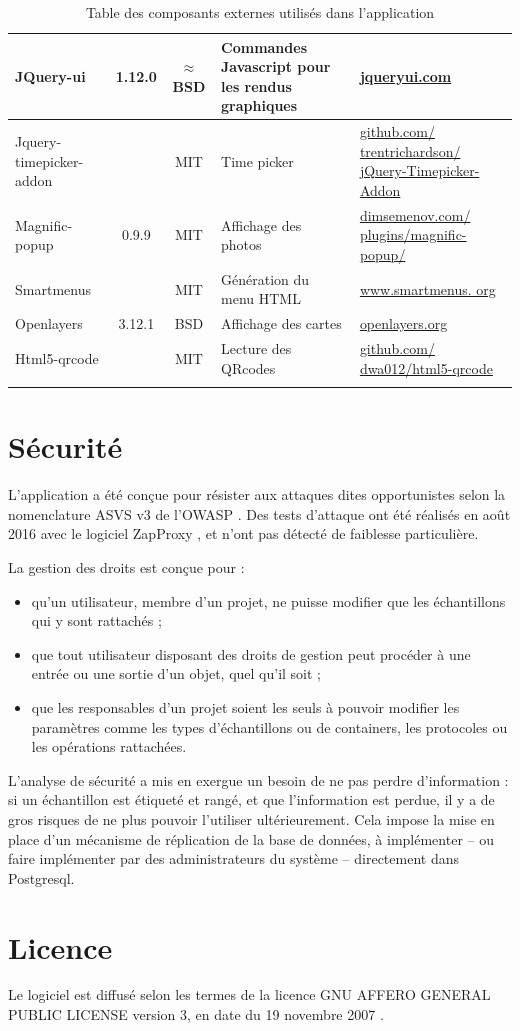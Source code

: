 \begin{longtable}{|>{\raggedright\arraybackslash}p{3cm}|c|c|>{\raggedright\arraybackslash}p{3cm}|>{\raggedright\arraybackslash}p{3cm}|}
\hline 
JQuery-ui & 1.12.0 & $\approx$ BSD & Commandes Javascript pour les rendus graphiques & \href{http://jqueryui.com/}{jqueryui.com} \\ 
\hline 
Jquery-timepicker-addon &  & MIT & Time picker & \href{https://github.com/trentrichardson/jQuery-Timepicker-Addon}{github.com/ trentrichardson/ jQuery-Timepicker-Addon} \\ 
\hline 
Magnific-popup & 0.9.9 & MIT & Affichage des photos & \href{http://dimsemenov.com/plugins/magnific-popup/}{dimsemenov.com/ plugins/magnific-popup/}\\ 
\hline 
Smartmenus &  & MIT & Génération du menu HTML & \href{http://www.smartmenus.org}{www.smartmenus. org} \\ 
\hline 
Openlayers & 3.12.1 & BSD & Affichage des cartes & \href{http://openlayers.org/}{openlayers.org} \\ 
\hline 
Html5-qrcode &  & MIT & Lecture des QRcodes &  \href{https://github.com/dwa012/html5-qrcode}{github.com/ dwa012/html5-qrcode}\\ 
\hline 

\caption{Table des composants externes utilisés dans l'application}
\end{longtable} 

\section{Sécurité}

L'application a été conçue pour résister aux attaques dites opportunistes selon la nomenclature ASVS v3 \cite{asvs} de l'OWASP \cite{owasp}. Des tests d'attaque ont été réalisés en août 2016 avec le logiciel ZapProxy \cite{zaproxy}, et n'ont pas détecté de faiblesse particulière.

La gestion des droits est conçue pour :
\begin{itemize}
\item qu'un utilisateur, membre d'un projet, ne puisse modifier que les échantillons qui y sont rattachés ;
\item que tout utilisateur disposant des droits de gestion peut procéder à une entrée ou une sortie d'un objet, quel qu'il soit ;
\item que les responsables d'un projet soient les seuls à pouvoir modifier les paramètres comme les types d'échantillons ou de containers, les protocoles ou les opérations rattachées.
\end{itemize}
L'analyse de sécurité a mis en exergue un besoin de ne pas perdre d'information : si un échantillon est étiqueté et rangé, et que l'information est perdue, il y a de gros risques de ne plus pouvoir l'utiliser ultérieurement. Cela impose la mise en place d'un mécanisme de réplication de la base de données, à implémenter -- ou faire implémenter par des administrateurs du système -- directement dans Postgresql.

\section{Licence}
Le logiciel est diffusé selon les termes de la licence GNU AFFERO GENERAL PUBLIC LICENSE version 3, en date du 19 novembre 2007 \cite{agpl}.